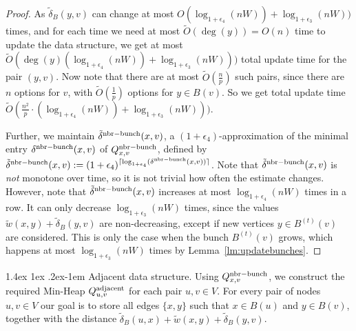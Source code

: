 \documentclass[11pt]{article}
\makeatletter
\theoremstyle{definition}
\theoremstyle{remark}
\newtheorem*{remark}{Remark}
\renewcommand{\paragraph}{%
  \@startsection{paragraph}{4}%
  {\z@}{1.4ex \@plus 1ex \@minus .2ex}{-1em}%
  {\normalfont\normalsize\bfseries}%
}
\makeatother
\begin{document}
\begin{proof}
    
    As $\tilde\delta_B(y,v)$ can change at most $O(\log_{1+\epsilon_4}(nW))+\log_{1+\epsilon_3}(nW))$ times, and for each time we need at most $\tilde O(\deg(y))=O(n)$ time to update the data structure, we get at most $\tilde O(\deg(y)(\log_{1+\epsilon_4}(nW))+\log_{1+\epsilon_3}(nW)))$ total update time for the pair $(y,v)$. Now note that there are at most $\tilde O(\tfrac{n}{p})$ such pairs, since there are $n$ options for $v$, with $\tilde O(\tfrac{1}{p})$ options for $y\in B(v)$. So we get total update time  $ \tilde O (\tfrac{n^2}{p} \cdot (\log_{1+\epsilon_4}(nW))+\log_{1+\epsilon_3}(nW))) $.
     
    Further, we maintain $\tilde\delta^{\rm{nbr-bunch}}(x,v)$, a $(1+\epsilon_4)$-approximation of the minimal entry $\delta^{\rm{nbr-bunch}}(x,v)$ of $Q^{\rm{nbr-bunch}}_{x,v}$, defined by $\tilde\delta^{\rm{nbr-bunch}}(x,v):= (1+\epsilon_4)^{\lceil\log_{1+\epsilon_4}(\delta^{\rm{nbr-bunch}}(x,v))\rceil}$. 
    Note that $\tilde\delta^{\rm{nbr-bunch}}(x,v)$ is \emph{not} monotone over time, so it is not trivial how often the estimate changes. However, note that $\tilde\delta^{\rm{nbr-bunch}}(x,v)$ increases at most $\log_{1+\epsilon_4}(nW)$ times in a row. It can only decrease $\log_{1+\epsilon_3}(nW)$ times, since the values $\tilde w(x,y)+\tilde\delta_B(y,v)$ are non-decreasing, except if new vertices $y\in B^{(t)}(v)$ are considered. This is only the case when the bunch $B^{(t)}(v)$ grows, which happens at most $\log_{1+\epsilon_3}(nW)$ times by Lemma~\ref{lm:updatebunches}.
\end{proof}


\paragraph{Adjacent data structure.}
Using $Q^{\rm{nbr-bunch}}_{x,v}$, we construct the required Min-Heap $Q^{\rm{adjacent}}_{u,v}$ for each pair $u,v\in V$. For every pair of nodes $ u, v \in V $ our goal is to store all edges $ \{x, y\} $ such that $ x \in B (u) $ and $ y \in B (v) $, together with the distance $\tilde\delta_B(u,x)+\tilde w(x,y)+\tilde\delta_B(y,v)$.
\end{document}
